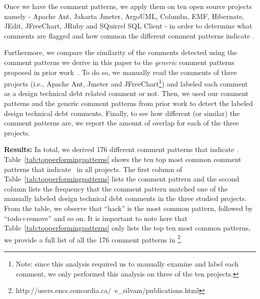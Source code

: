 Once we have the comment patterns, we apply them on ten open source projects namely - Apache Ant, Jakarta Jmeter, ArgoUML, Columba, EMF, Hibernate, JEdit, JFreeChart, JRuby and SQuirrel SQL Client - in order to determine what comments are flagged and how common the different comment patterns indicate \SADTD. 

Furthermore, we compare the similarity of the comments detected using the comment patterns we derive in this paper to the \emph{generic} comment patterns proposed in prior work~\cite{Potdar2014ICSME}. To do so, we manually read the comments of three projects (i.e., Apache Ant, Jmeter and JFreeChart\footnote{Note: since this analysis required us to manually examine and label each comment, we only performed this analysis on three of the ten projects.}) and labeled each comment as a design technical debt related comment or not. Then, we used our comment patterns and the generic comment patterns from prior work to detect the labeled design technical debt comments. Finally, to see how different (or similar) the comment patterns are, we report the amount of overlap for each of the three projects.


 

\noindent \textbf{Results:} 
In total, we derived 176 different comment patterns that indicate \SADTD. Table~\ref{tab:topperformingpatterns} shows the ten top most common comment patterns that indicate \SADTD~in all projects. The first column of Table~\ref{tab:topperformingpatterns} lists the comment pattern and the second column lists the frequency that the comment pattern matched one of the manually labeled design technical debt comments in the three studied projects. From the table, we observe that ``hack'' is the most common pattern, followed by ``todo+remove'' and so on. It is important to note here that Table~\ref{tab:topperformingpatterns} only lists the top ten most common patterns, we provide a full list of all the 176 comment patterns in \footnote{http://users.encs.concordia.ca/~e\_silvam/publications.html}.

